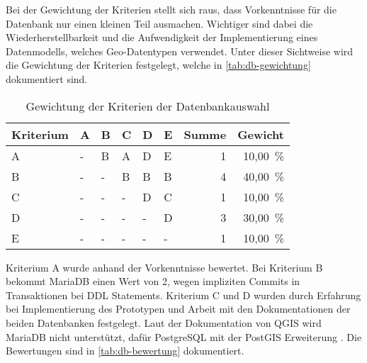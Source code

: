 Bei der Gewichtung der Kriterien stellt sich raus, dass Vorkenntnisse für die Datenbank nur einen kleinen Teil ausmachen.
Wichtiger sind dabei die Wiederherstellbarkeit und die Aufwendigkeit der Implementierung eines Datenmodells, welches Geo-Datentypen verwendet.
Unter dieser Sichtweise wird die Gewichtung der Kriterien festgelegt, welche in \autoref{tab:db-gewichtung} dokumentiert sind.

\begin{table}[h]
	\caption{Gewichtung der Kriterien der Datenbankauswahl}
	\begin{center}
		\begin{tabular}{llllllrr}
			\toprule
			Kriterium & A & B & C & D & E & \multicolumn{1}{l}{Summe} & \multicolumn{1}{l}{Gewicht} \\ \midrule
			A         & - & B & A & D & E &                         1 &                    10,00 \% \\
			B         & - & - & B & B & B &                         4 &                    40,00 \% \\
			C         & - & - & - & D & C &                         1 &                    10,00 \% \\
			D         & - & - & - & - & D &                         3 &                    30,00 \% \\
			E         & - & - & - & - & - &                         1 &                    10,00 \% \\
			\bottomrule
		\end{tabular}
	\end{center}
	\label{tab:db-gewichtung}
\end{table}

Kriterium A wurde anhand der Vorkenntnisse bewertet.
Bei Kriterium B bekommt MariaDB einen Wert von 2, wegen impliziten Commits in Transaktionen bei \ac{DDL} Statements.
Kriterium C und D wurden durch Erfahrung bei Implementierung des Prototypen und Arbeit mit den Dokumentationen der beiden Datenbanken festgelegt.
Laut der Dokumentation von QGIS wird MariaDB nicht unterstützt, dafür PostgreSQL mit der PostGIS Erweiterung \autocite[vgl.][]{qgis.od}.
Die Bewertungen sind in \autoref{tab:db-bewertung} dokumentiert.


